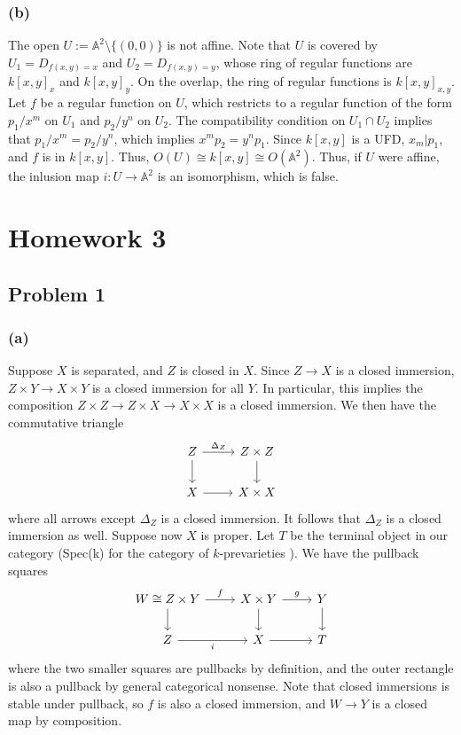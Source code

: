 \documentclass{article}
\theoremstyle{definition}
\theoremstyle{definition}
\theoremstyle{definition}
\theoremstyle{definition}
\theoremstyle{definition}
\theoremstyle{definition}
\theoremstyle{definition}
\begin{document}
\subsubsection*{(b)}
The open $U:=\mathbb{A}^2\setminus \{(0,0)\}$ is not affine. Note that $U$ is covered by $U_1=D_{f(x,y)=x}$ and $U_2=D_{f(x,y)=y}$, whose ring of regular functions are $k[x,y]_x$ and $k[x,y]_y$. On the overlap, the ring of regular functions is $k[x,y]_{x,y}$. Let $f$ be a regular function on $U$, which restricts to a regular function of the form $p_1/x^m$ on $U_1$ and $p_2/y^n$ on $U_2$. The compatibility condition on $U_1\cap U_2$ implies that $p_1/x^m=p_2/y^n$, which implies $x^mp_2=y^np_1$. Since $k[x,y]$ is a UFD, $x_m| p_1$, and $f$ is in $k[x,y]$. Thus, $O(U)\cong k[x,y]\cong O(\mathbb{A}^2)$. Thus, if $U$ were affine, the inlusion map $i: U\to \mathbb{A}^2$ is an isomorphism, which is false. 



\section*{Homework 3}
\subsection*{Problem 1}
\subsubsection*{(a)}
Suppose $X$ is separated, and $Z$ is closed in $X$. Since $Z\to X$ is a closed immersion, $Z\times Y\to X\times Y$ is a closed immersion for all $Y$. In particular, this implies the composition $Z\times Z\to Z\times X\to X\times X$ is a closed immersion. We then have the commutative triangle
\[\begin{tikzcd}
Z\arrow[r,"\Delta_Z"]\arrow[d]& Z\times Z\arrow[d]\\
X\arrow[r]& X\times X
\end{tikzcd}
\]
where all arrows except $\Delta_Z$ is a closed immersion. It follows that $\Delta_Z$ is a closed immersion as well. Suppose now $X$ is proper. Let $T$ be the terminal object in our category (Spec(k) for the category of $k$-prevarieties ). We have the pullback squares
\[\begin{tikzcd}
	W\cong Z\times Y & {X\times Y} & Y \\
	Z & X & T
	\arrow["f", from=1-1, to=1-2]
	\arrow[from=1-1, to=2-1]
	\arrow["g", from=1-2, to=1-3]
	\arrow[from=1-2, to=2-2]
	\arrow[from=1-3, to=2-3]
	\arrow["i"', from=2-1, to=2-2]
	\arrow[from=2-2, to=2-3]
\end{tikzcd}\]
where the two smaller squares are pullbacks by definition, and the outer rectangle is also a pullback by general categorical nonsense. Note that closed immersions is stable under pullback, so $f$ is also a closed immersion, and $W\to Y$ is a closed map by composition. 
\end{document}
